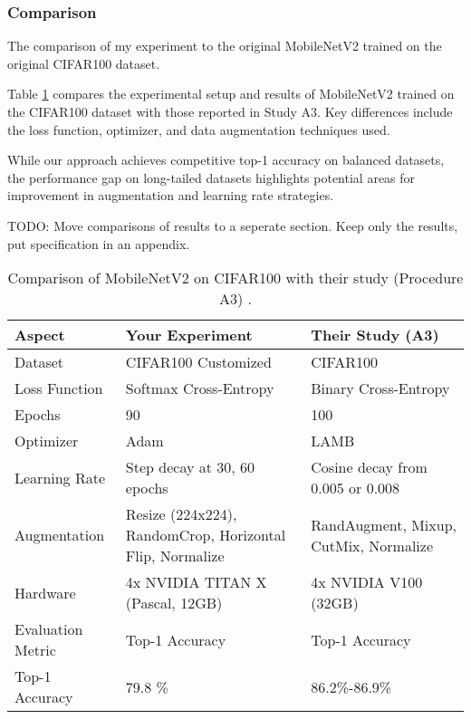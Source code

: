 \subsubsection{Comparison}

The comparison of my experiment to the original MobileNetV2 trained on the original CIFAR100 dataset.

Table \ref{tab:comparison} compares the experimental setup and results of MobileNetV2 trained on the CIFAR100 dataset with those reported in Study A3. Key differences include the loss function, optimizer, and data augmentation techniques used.

While our approach achieves competitive top-1 accuracy on balanced datasets, the performance gap on long-tailed datasets highlights potential areas for improvement in augmentation and learning rate strategies.

TODO: Move comparisons of results to a seperate section. Keep only the results, put specification in an appendix.

\begin{table}[H]
    \centering
    \begin{tabular}{lp{5cm}p{5cm}}
        \toprule
        \textbf{Aspect} & \textbf{Your Experiment} & \textbf{Their Study (A3)} \\ 
        \midrule
        Dataset            & CIFAR100 Customized                & CIFAR100                \\
        Loss Function      & Softmax Cross-Entropy   & Binary Cross-Entropy    \\
        Epochs             & 90                      & 100                     \\
        Optimizer          & Adam                    & LAMB                    \\
        Learning Rate      & Step decay at 30, 60 epochs & Cosine decay from 0.005 or 0.008 \\
        Augmentation       & Resize (224x224), RandomCrop, Horizontal Flip, Normalize & RandAugment, Mixup, CutMix, Normalize \\
        Hardware           & 4x NVIDIA TITAN X (Pascal, 12GB) & 4x NVIDIA V100 (32GB) \\
        Evaluation Metric  & Top-1 Accuracy          & Top-1 Accuracy          \\
        Top-1 Accuracy     & 79.8 \% & 86.2\%-86.9\%           \\
        \bottomrule
    \end{tabular}
    \caption{Comparison of MobileNetV2 on CIFAR100 with their study (Procedure A3) \cite{wightman2021resnetstrikesbackimproved}.}
    \label{tab:comparison}
\end{table}


